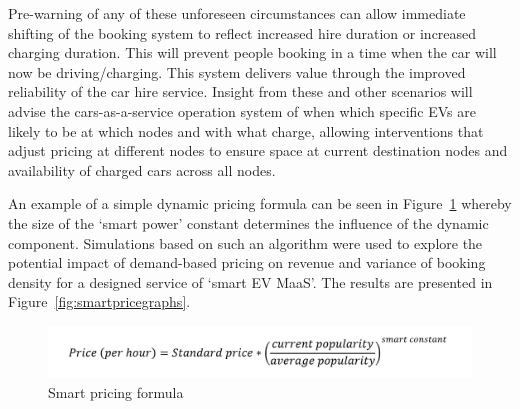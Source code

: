 \documentclass[b5paper,10pt]{article}
\begin{document}
Pre-warning of any of these unforeseen circumstances can allow
immediate shifting of the booking system to reflect increased hire
duration or increased charging duration. This will prevent people
booking in a time when the car will now be driving/charging. This
system delivers value through the improved reliability of the car hire
service. Insight from these and other scenarios will advise the
cars-as-a-service operation system of when which specific EVs are
likely to be at which nodes and with what charge, allowing
interventions that adjust pricing at different nodes to ensure space
at current destination nodes and availability of charged cars across
all nodes.

An example of a simple dynamic pricing formula can be seen in
Figure~\ref{fig:smartpricingformula} whereby the size of the `smart
power' constant determines the influence of the dynamic component.
Simulations based on such an algorithm were used to explore the
potential impact of demand-based pricing on revenue and variance of
booking density for a designed service of `smart EV MaaS'. The results
are presented in Figure~\ref{fig:smartpricegraphs}.


\begin{figure}[htb]
\centering
\includegraphics[width=0.75\columnwidth]{images/smartpricingformula.png}
\caption{Smart pricing formula}
\label{fig:smartpricingformula}
\end{figure}

\end{document}
